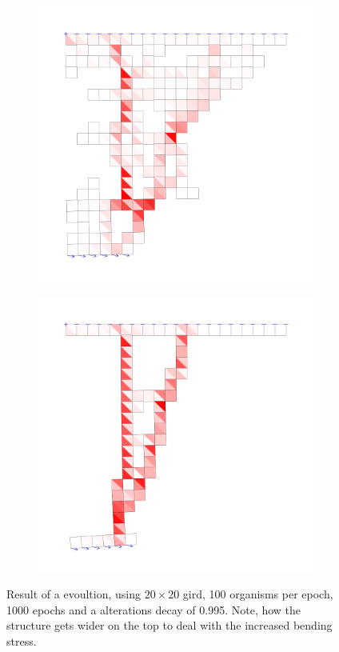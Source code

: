 \documentclass[12pt]{article}
\begin{document}
\begin{figure}[h]
    \begin{subfigure}[b]{0.45\textwidth}
        \includegraphics[width=\linewidth]{images/debug1500.png} 
    \end{subfigure}%
    \begin{subfigure}[b]{0.45\textwidth}
        \includegraphics[width=\linewidth]{images/debug8625.png} 
    \end{subfigure}
    \caption{Result of a evoultion, using $20\times20$ gird, 100 organisms per epoch, 1000 epochs and a alterations decay of 0.995. Note, how the structure gets wider on the top to deal with the increased bending stress.}
    \label{fig:Evolution}
\end{figure}
\end{document}
